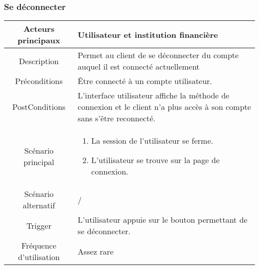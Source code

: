 \documentclass{article}
\begin{document}
   \newpage

\subsubsection{Se déconnecter}
   \begin{table}[h]
         \begin{tabular}{|c|p{10cm}|}
            \hline
            Acteurs principaux& Utilisateur et institution financière \\
            \hline
            Description&Permet au client de se déconnecter du compte auquel il est connecté actuellement \\
            \hline
            Préconditions&\^Etre connecté à un compte utilisateur.\\
            \hline
            PostConditions&L'interface utilisateur affiche la méthode de connexion et le client n'a plus accès à son compte sans s'être reconnecté.\\
            \hline
            Scénario principal& 
                  \begin{enumerate}
                     \item La session de l'utilisateur se ferme.
                     \item L'utilisateur se trouve sur la page de connexion.
                  \end{enumerate}     \\
            \hline
            Scénario alternatif&/\\
            \hline
            Trigger&L'utilisateur appuie sur le bouton permettant de se déconnecter.\\
            \hline
            Fréquence d'utilisation&Assez rare\\
            \hline
         \end{tabular}
   \end{table}

\newpage
\end{document}
